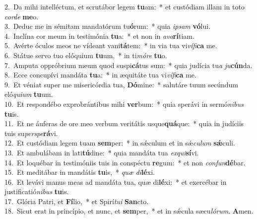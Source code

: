 {2.~}Da mihi intelléctum, et scrutábor legem \textbf{tu}am:~* et custódiam illam in toto \textit{cor}\textit{de} \textbf{me}o.\\
{3.~}Deduc me in sémitam mandatórum tu\textbf{ó}rum:~* quia \textit{i}\textit{psam} \textbf{vó}lui.\\
{4.~}Inclína cor meum in testimónia \textbf{tu}a:~* et non in \textit{a}\textit{va}\textbf{rí}tiam.\\
{5.~}Avérte óculos meos ne vídeant vani\textbf{tá}tem:~* in via tua vi\textit{ví}\textit{fi}\textbf{ca} me.\\
{6.~}Státue servo tuo elóquium \textbf{tu}um,~* in ti\textit{mó}\textit{re} \textbf{tu}o.\\
{7.~}Amputa oppróbrium meum quod suspi\textbf{cá}tus sum:~* quia judícia tu\textit{a} \textit{ju}\textbf{cún}da.\\
{8.~}Ecce concupívi mandáta \textbf{tu}a:~* in æquitáte tua vi\textit{ví}\textit{fi}\textbf{ca} me.\\
{9.~}Et véniat super me misericórdia tua, \textbf{Dó}mine:~* salutáre tuum secúndum eló\textit{qui}\textit{um} \textbf{tu}um.\\
{10.~}Et respondébo exprobrántibus mihi \textbf{ver}bum:~* quia sperávi in sermó\textit{ni}\textit{bus} \textbf{tu}is.\\
{11.~}Et ne áuferas de ore meo verbum veritátis usque\textbf{quá}que:~* quia in judíciis tuis su\textit{per}\textit{spe}\textbf{rá}vi.\\
{12.~}Et custódiam legem tuam \textbf{sem}per:~* in sǽculum et in sǽ\textit{cu}\textit{lum} \textbf{sǽ}culi.\\
{13.~}Et ambulábam in lati\textbf{tú}dine:~* quia mandáta tua \textit{ex}\textit{qui}\textbf{sí}vi.\\
{14.~}Et loquébar in testimóniis tuis in conspéctu \textbf{re}gum:~* et non \textit{con}\textit{fun}\textbf{dé}bar.\\
{15.~}Et meditábar in mandátis \textbf{tu}is,~* \textit{quæ} \textit{di}\textbf{lé}xi.\\
{16.~}Et levávi manus meas ad mandáta tua, quæ di\textbf{lé}xi:~* et exercébar in justificatió\textit{ni}\textit{bus} \textbf{tu}is.\\
{17.~}Glória Patri, et \textbf{Fí}lio,~* et Spirí\textit{tu}\textit{i} \textbf{San}cto.\\
{18.~}Sicut erat in princípio, et nunc, et \textbf{sem}per,~* et in sǽcula sæcu\textit{ló}\textit{rum}. \textbf{A}men.\\
